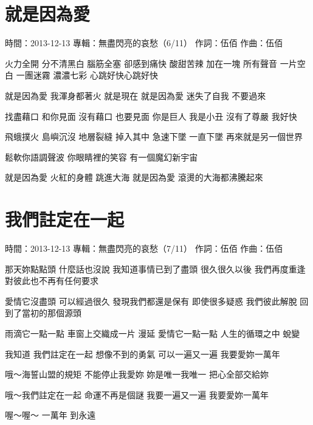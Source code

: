 \documentclass[UTF8,a4paper,oneside,twocolumn,12pt]{ctexbook}
\newcommand{\infopair}[2]{\textbullet #1：#2}
\newcommand{\zc}[1][伍佰]{\infopair{作詞}{#1}}
\newcommand{\zq}[1][伍佰]{\infopair{作曲}{#1}}
\newcommand{\zj}[1]{\infopair{專輯}{#1}}
\newcommand{\sj}[1]{\infopair{時間}{#1}}
\newenvironment{info}{\begin{flushleft}\kaishu
	}
	{\end{flushleft}\normalsize\yahei\par}
\newenvironment{lyric}{
	}
{}
\begin{document}
\section{就是因為愛}
\begin{info}
	\sj{2013-12-13}
	\zj{無盡閃亮的哀愁（6/11）}
	\zc
	\zq
\end{info}
\begin{lyric}
	火力全開 分不清黑白
	腦筋全塞 卻感到痛快
	酸甜苦辣 加在一塊
	所有聲音 一片空白
	一團迷霧 濃濃七彩
	心跳好快心跳好快

	就是因為愛
	我渾身都著火 就是現在
	就是因為愛
	迷失了自我 不要過來

	找盡藉口 和你見面
	沒有藉口 也要見面
	你是巨人 我是小丑
	沒有了尊嚴 我好快

	飛蛾撲火 島嶼沉沒
	地層裂縫 掉入其中
	急速下墜 一直下墜
	再來就是另一個世界

	鬆軟你語調聲波
	你眼睛裡的笑容
	有一個魔幻新宇宙

	就是因為愛
	火紅的身體 跳進大海
	就是因為愛
	滾燙的大海都沸騰起來
\end{lyric}

\section{我們註定在一起}
\begin{info}
	\sj{2013-12-13}
	\zj{無盡閃亮的哀愁（7/11）}
	\zc
	\zq
\end{info}
\begin{lyric}
	那天妳點點頭 什麼話也沒說
	我知道事情已到了盡頭
	很久很久以後 我們再度重逢
	對彼此也不再有任何要求

	愛情它沒盡頭 可以經過很久
	發現我們都還是保有
	即使很多疑惑 我們彼此解脫
	回到了當初的那個源頭

	雨滴它一點一點 車窗上交織成一片 漫延
	愛情它一點一點 人生的循環之中 蛻變

	我知道
	我們註定在一起 想像不到的勇氣
	可以一遍又一遍 我要愛妳一萬年

	哦～海誓山盟的規矩 不能停止我愛妳
	妳是唯一我唯一 把心全部交給妳

	哦～我們註定在一起 命運不再是個謎
	我要一遍又一遍 我要愛妳一萬年

	喔～喔～
	一萬年
	到永遠
\end{lyric}
\end{document}
